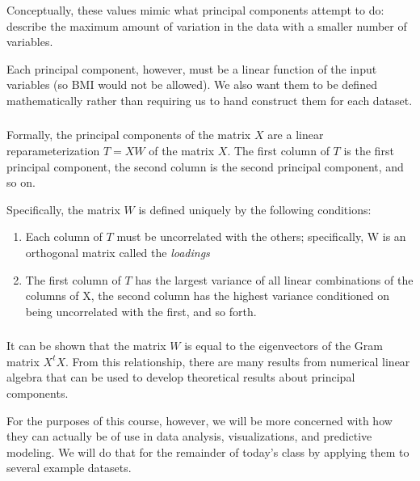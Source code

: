 \documentclass[xetex,mathserif,serif,aspectratio=169]{beamer}
\begin{document}
\begin{frame}[fragile] \frametitle{}  \oldB \small


Conceptually, these values mimic what principal components attempt to
do: describe the maximum amount of variation in the data with a smaller
number of variables.

Each principal component, however, must be a linear function of the
input variables (so BMI would not be allowed). We also want them to
be defined mathematically rather than requiring us to hand construct
them for each dataset.

\end{frame}

\begin{frame}[fragile] \frametitle{}  \oldB \small


Formally, the principal components of the matrix $X$ are a linear
reparameterization $T=XW$ of the matrix $X$. The first column of
$T$ is the first principal component, the second column is the second
principal component, and so on.

Specifically, the matrix $W$ is defined uniquely by the following
conditions:
\begin{enumerate}
\item Each column of $T$ must be uncorrelated with the others;
specifically, W is an orthogonal matrix called the \textit{loadings}
\item The first column of $T$ has the largest variance of all
linear combinations of the columns of X, the second column has the
highest variance conditioned on being uncorrelated with the
first, and so forth.
\end{enumerate}

\end{frame}

\begin{frame}[fragile] \frametitle{}  \oldB \small


It can be shown that the matrix $W$ is equal to the eigenvectors
of the Gram matrix $X^tX$. From this relationship, there are many
results from numerical linear algebra that can be used to develop
theoretical results about principal components.

For the purposes of this course, however, we will be more concerned
with how they can actually be of use in data analysis, visualizations,
and predictive modeling. We will do that for the remainder of today's
class by applying them to several example datasets.

\end{frame}
\end{document}
